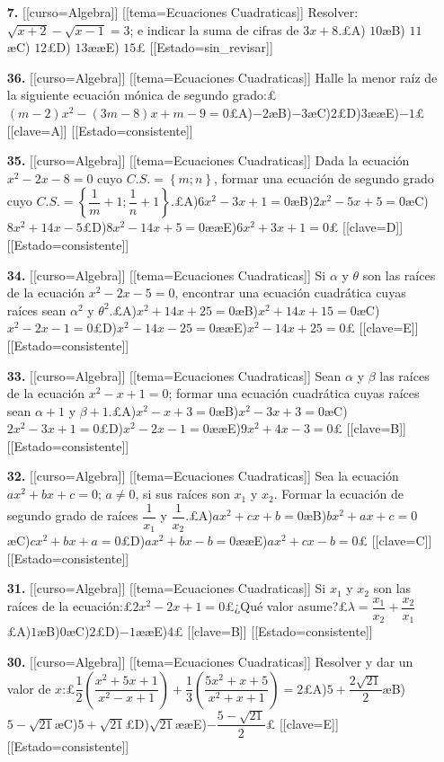 \begin{enumerate}
\item[\textbf{7.}] [[curso=Algebra]] [[tema=Ecuaciones Cuadraticas]] Resolver: $\sqrt{x+2}-\sqrt{x-1}=3$; e indicar la suma de cifras de $3x+8$.£A) $10$æB) $11$æC) $12$£D) $13$ææE) $15$£ [[Estado=sin_revisar]]
\item[\textbf{36.}] [[curso=Algebra]] [[tema=Ecuaciones Cuadraticas]] Halle la menor raíz de la siguiente ecuación mónica de segundo grado:£$\left(m-2\right)x^2-\left(3m-8\right)x+m-9=0$£A)$-2$æB)$-3$æC)$2$£D)$3$ææE)$-1$£ [[clave=A]] [[Estado=consistente]]
\item[\textbf{35.}] [[curso=Algebra]] [[tema=Ecuaciones Cuadraticas]] Dada la ecuación $x^2-2x-8=0$ cuyo $C.S.=\left\{m;n\right\}$, formar una ecuación de segundo grado cuyo $C.S.=\left\{\dfrac{1}{m}+1;\dfrac{1}{n}+1\right\}$.£A)$6x^2-3x+1=0$æB)$2x^2-5x+5=0$æC)$8x^2+14x-5$£D)$8x^2-14x+5=0$ææE)$6x^2+3x+1=0$£ [[clave=D]] [[Estado=consistente]]
\item[\textbf{34.}] [[curso=Algebra]] [[tema=Ecuaciones Cuadraticas]] Si $\alpha$ y $\theta$ son las raíces de la ecuación $x^2-2x-5=0$, encontrar una ecuación cuadrática cuyas raíces sean $\alpha^2$ y $\theta^2$.£A)$x^2+14x+25=0$æB)$x^2+14x+15=0$æC)$x^2-2x-1=0$£D)$x^2-14x-25=0$ææE)$x^2-14x+25=0$£ [[clave=E]] [[Estado=consistente]]
\item[\textbf{33.}] [[curso=Algebra]] [[tema=Ecuaciones Cuadraticas]] Sean $\alpha$ y $\beta$ las raíces de la ecuación $x^2-x+1=0$; formar una ecuación cuadrática cuyas raíces sean $\alpha+1$ y $\beta+1$.£A)$x^2-x+3=0$æB)$x^2-3x+3=0$æC)$2x^2-3x+1=0$£D)$x^2-2x-1=0$ææE)$9x^2+4x-3=0$£ [[clave=B]] [[Estado=consistente]]
\item[\textbf{32.}] [[curso=Algebra]] [[tema=Ecuaciones Cuadraticas]] Sea la ecuación $ax^2+bx+c=0$; $a\neq0$, si sus raíces son $x_1$ y $x_2$. Formar la ecuación de segundo grado de raíces $\dfrac{1}{x_1}$ y $\dfrac{1}{x_2}$.£A)$ax^2+cx+b=0$æB)$bx^2+ax+c=0$æC)$cx^2+bx+a=0$£D)$ax^2+bx-b=0$ææE)$ax^2+cx-b=0$£ [[clave=C]] [[Estado=consistente]]
\item[\textbf{31.}] [[curso=Algebra]] [[tema=Ecuaciones Cuadraticas]] Si $x_1$ y $x_2$ son las raíces de la ecuación:£$2x^2-2x+1=0$£¿Qué valor asume?£$\lambda=\dfrac{x_1}{x_2}+\dfrac{x_2}{x_1}$£A)$1$æB)$0$æC)$2$£D)$-1$ææE)$4$£ [[clave=B]] [[Estado=consistente]]
\item[\textbf{30.}] [[curso=Algebra]] [[tema=Ecuaciones Cuadraticas]] Resolver y dar un valor de $x$:£$\dfrac{1}{2}\left(\dfrac{x^2+5x+1}{x^2-x+1}\right)+\dfrac{1}{3}\left(\dfrac{5x^2+x+5}{x^2+x+1}\right)=2$£A)$5+\dfrac{2\sqrt{21}}{2}$æB)$5-\sqrt{21}$æC)$5+\sqrt{21}$£D)$\sqrt{21}$ææE)$-\dfrac{5-\sqrt{21}}{2}$£ [[clave=E]] [[Estado=consistente]]

\end{enumerate}
